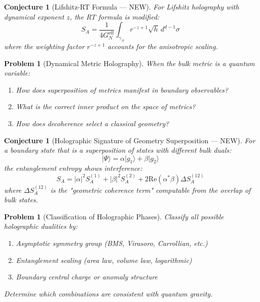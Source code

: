 \documentclass[12pt,a4paper]{article}
\newtheorem{conjecture}[theorem]{Conjecture}
\newtheorem{problem}[theorem]{Problem}
\begin{document}
\begin{conjecture}[Lifshitz-RT Formula --- NEW]
For Lifshitz holography with dynamical exponent $z$, the RT formula is modified:
\begin{equation}
S_A = \frac{1}{4G_N^{\text{eff}}} \int_{\gamma_A} r^{-z+1} \sqrt{h} \, d^{d-1}\sigma
\end{equation}
where the weighting factor $r^{-z+1}$ accounts for the anisotropic scaling.
\end{conjecture}

\begin{problem}[Dynamical Metric Holography]
When the bulk metric is a quantum variable:
\begin{enumerate}
    \item How does superposition of metrics manifest in boundary observables?
    \item What is the correct inner product on the space of metrics?
    \item How does decoherence select a classical geometry?
\end{enumerate}
\end{problem}

\begin{conjecture}[Holographic Signature of Geometry Superposition --- NEW]
For a boundary state that is a superposition of states with different bulk duals:
\begin{equation}
|\Psi\rangle = \alpha |g_1\rangle + \beta |g_2\rangle
\end{equation}
the entanglement entropy shows interference:
\begin{equation}
S_A = |\alpha|^2 S_A^{(1)} + |\beta|^2 S_A^{(2)} + 2 \text{Re}(\alpha^* \beta) \Delta S_A^{(12)}
\end{equation}
where $\Delta S_A^{(12)}$ is the "geometric coherence term" computable from the overlap of bulk states.
\end{conjecture}

\begin{problem}[Classification of Holographic Phases]
Classify all possible holographic dualities by:
\begin{enumerate}
    \item Asymptotic symmetry group (BMS, Virasoro, Carrollian, etc.)
    \item Entanglement scaling (area law, volume law, logarithmic)
    \item Boundary central charge or anomaly structure
\end{enumerate}
Determine which combinations are consistent with quantum gravity.
\end{problem}
\end{document}
